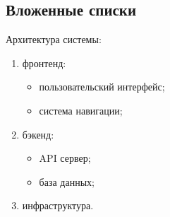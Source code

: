 \documentclass{article}
\begin{document}
\subsection{Вложенные списки}

Архитектура системы:
\begin{enumerate}
\item фронтенд:
    \begin{itemize}
    \item пользовательский интерфейс;
    \item система навигации;
    \end{itemize}
\item бэкенд:
    \begin{itemize}
    \item API сервер;
    \item база данных;
    \end{itemize}
\item инфраструктура.
\end{enumerate}
\end{document}
